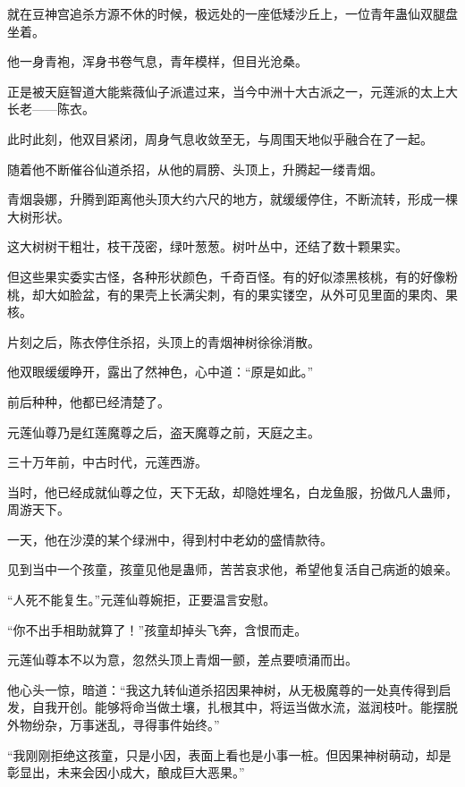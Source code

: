 
\begin{this_body}

就在豆神宫追杀方源不休的时候，极远处的一座低矮沙丘上，一位青年蛊仙双腿盘坐着。

他一身青袍，浑身书卷气息，青年模样，但目光沧桑。

正是被天庭智道大能紫薇仙子派遣过来，当今中洲十大古派之一，元莲派的太上大长老——陈衣。

此时此刻，他双目紧闭，周身气息收敛至无，与周围天地似乎融合在了一起。

随着他不断催谷仙道杀招，从他的肩膀、头顶上，升腾起一缕青烟。

青烟袅娜，升腾到距离他头顶大约六尺的地方，就缓缓停住，不断流转，形成一棵大树形状。

这大树树干粗壮，枝干茂密，绿叶葱葱。树叶丛中，还结了数十颗果实。

但这些果实委实古怪，各种形状颜色，千奇百怪。有的好似漆黑核桃，有的好像粉桃，却大如脸盆，有的果壳上长满尖刺，有的果实镂空，从外可见里面的果肉、果核。

片刻之后，陈衣停住杀招，头顶上的青烟神树徐徐消散。

他双眼缓缓睁开，露出了然神色，心中道：“原是如此。”

前后种种，他都已经清楚了。

元莲仙尊乃是红莲魔尊之后，盗天魔尊之前，天庭之主。

三十万年前，中古时代，元莲西游。

当时，他已经成就仙尊之位，天下无敌，却隐姓埋名，白龙鱼服，扮做凡人蛊师，周游天下。

一天，他在沙漠的某个绿洲中，得到村中老幼的盛情款待。

见到当中一个孩童，孩童见他是蛊师，苦苦哀求他，希望他复活自己病逝的娘亲。

“人死不能复生。”元莲仙尊婉拒，正要温言安慰。

“你不出手相助就算了！”孩童却掉头飞奔，含恨而走。

元莲仙尊本不以为意，忽然头顶上青烟一颤，差点要喷涌而出。

他心头一惊，暗道：“我这九转仙道杀招因果神树，从无极魔尊的一处真传得到启发，自我开创。能够将命当做土壤，扎根其中，将运当做水流，滋润枝叶。能摆脱外物纷杂，万事迷乱，寻得事件始终。”

“我刚刚拒绝这孩童，只是小因，表面上看也是小事一桩。但因果神树萌动，却是彰显出，未来会因小成大，酿成巨大恶果。”


\end{this_body}
